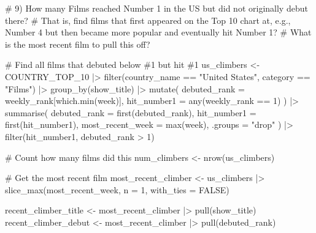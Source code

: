 \documentclass[
  12pt,
  letterpaper,
  DIV=11,
  numbers=noendperiod]{scrartcl}
\newenvironment{Shaded}{\begin{snugshade}}{\end{snugshade}}
\newcommand{\AttributeTok}[1]{\textcolor[rgb]{0.40,0.45,0.13}{#1}}
\newcommand{\CommentTok}[1]{\textcolor[rgb]{0.37,0.37,0.37}{#1}}
\newcommand{\ConstantTok}[1]{\textcolor[rgb]{0.56,0.35,0.01}{#1}}
\newcommand{\DecValTok}[1]{\textcolor[rgb]{0.68,0.00,0.00}{#1}}
\newcommand{\FunctionTok}[1]{\textcolor[rgb]{0.28,0.35,0.67}{#1}}
\newcommand{\NormalTok}[1]{\textcolor[rgb]{0.00,0.23,0.31}{#1}}
\newcommand{\OtherTok}[1]{\textcolor[rgb]{0.00,0.23,0.31}{#1}}
\newcommand{\SpecialCharTok}[1]{\textcolor[rgb]{0.37,0.37,0.37}{#1}}
\newcommand{\StringTok}[1]{\textcolor[rgb]{0.13,0.47,0.30}{#1}}
\begin{document}
\begin{Shaded}
\begin{Highlighting}[]
\CommentTok{\# 9) How many Films reached Number 1 in the US but did not originally debut there? }
\CommentTok{\# That is, find films that first appeared on the Top 10 chart at, e.g., Number 4 but then became more popular and eventually hit Number 1? }
\CommentTok{\# What is the most recent film to pull this off?}

\CommentTok{\# Find all films that debuted below \#1 but hit \#1}
\NormalTok{us\_climbers }\OtherTok{\textless{}{-}}\NormalTok{ COUNTRY\_TOP\_10 }\SpecialCharTok{|\textgreater{}} 
  \FunctionTok{filter}\NormalTok{(country\_name }\SpecialCharTok{==} \StringTok{"United States"}\NormalTok{, category }\SpecialCharTok{==} \StringTok{"Films"}\NormalTok{) }\SpecialCharTok{|\textgreater{}} 
  \FunctionTok{group\_by}\NormalTok{(show\_title) }\SpecialCharTok{|\textgreater{}} 
  \FunctionTok{mutate}\NormalTok{(}
    \AttributeTok{debuted\_rank =}\NormalTok{ weekly\_rank[}\FunctionTok{which.min}\NormalTok{(week)],      }
    \AttributeTok{hit\_number1 =} \FunctionTok{any}\NormalTok{(weekly\_rank }\SpecialCharTok{==} \DecValTok{1}\NormalTok{)            }
\NormalTok{  ) }\SpecialCharTok{|\textgreater{}} 
  \FunctionTok{summarise}\NormalTok{(}
    \AttributeTok{debuted\_rank =} \FunctionTok{first}\NormalTok{(debuted\_rank),       }
    \AttributeTok{hit\_number1 =} \FunctionTok{first}\NormalTok{(hit\_number1),}
    \AttributeTok{most\_recent\_week =} \FunctionTok{max}\NormalTok{(week),}
    \AttributeTok{.groups =} \StringTok{"drop"}
\NormalTok{  ) }\SpecialCharTok{|\textgreater{}} 
  \FunctionTok{filter}\NormalTok{(hit\_number1, debuted\_rank }\SpecialCharTok{\textgreater{}} \DecValTok{1}\NormalTok{)}

\CommentTok{\# Count how many films did this}
\NormalTok{num\_climbers }\OtherTok{\textless{}{-}} \FunctionTok{nrow}\NormalTok{(us\_climbers)}

\CommentTok{\# Get the most recent film}
\NormalTok{most\_recent\_climber }\OtherTok{\textless{}{-}}\NormalTok{ us\_climbers }\SpecialCharTok{|\textgreater{}}
  \FunctionTok{slice\_max}\NormalTok{(most\_recent\_week, }\AttributeTok{n =} \DecValTok{1}\NormalTok{, }\AttributeTok{with\_ties =} \ConstantTok{FALSE}\NormalTok{)}

\NormalTok{recent\_climber\_title }\OtherTok{\textless{}{-}}\NormalTok{ most\_recent\_climber }\SpecialCharTok{|\textgreater{}} \FunctionTok{pull}\NormalTok{(show\_title)}
\NormalTok{recent\_climber\_debut }\OtherTok{\textless{}{-}}\NormalTok{ most\_recent\_climber }\SpecialCharTok{|\textgreater{}} \FunctionTok{pull}\NormalTok{(debuted\_rank)}
\end{Highlighting}
\end{Shaded}
\end{document}
